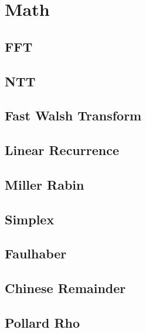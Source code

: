 \documentclass[a4paper,10pt,twocolumn,oneside]{article}
\begin{document}
\section{Math}
\subsection{FFT}


\subsection{NTT}


\subsection{Fast Walsh Transform}


%

\subsection{Linear Recurrence}


\subsection{Miller Rabin}


\subsection{Simplex}


\subsection{Faulhaber}


\subsection{Chinese Remainder}


\subsection{Pollard Rho}

\end{document}
